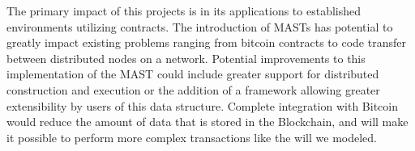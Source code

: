 \documentclass{vldb}
\begin{document}
The primary impact of this projects is in its applications to established environments utilizing contracts. The introduction of MASTs has potential to greatly impact existing problems ranging from bitcoin contracts to code transfer between distributed nodes on a network. Potential improvements to this implementation of the MAST could include greater support for distributed construction and execution or the addition of a framework allowing greater extensibility by users of this data structure. Complete integration with Bitcoin would reduce the amount of data that is stored in the Blockchain, and will make it possible to perform more complex transactions like the will we modeled.

\vfill



\end{document}
